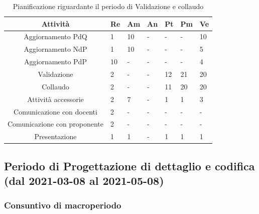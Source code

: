 \begin{table}[H]
	\centering
	\renewcommand{\arraystretch}{1.5}
	\begin{tabular}{|c|p{10mm}|p{10mm}|p{10mm}|p{10mm}|p{10mm}|p{10mm}|}
		\hline
		\rowcolor{lighter-grayer}
		Attività & Re & Am & An & Pt & Pm & Ve \\ \hline
		Aggiornamento PdQ          & 1  & 10 & - & - & - & 10 \\ \hline
		Aggiornamento NdP          & 1  & 10 & - & - & - & 5  \\ \hline
		Aggiornamento PdP          & 10 & - & - & - & - & 4  \\ \hline
		Validazione                & 2  & - & - & 12 & 21 & 20 \\ \hline
		Collaudo                   & 2  & - & - & 11 & 20 & 20 \\ \hline
		Attività accessorie 	   & 2  & 7  & - & 1  & 1  & 3  \\ \hline
		Comunicazione con docenti  & 2  & - & - & - & - & -   \\ \hline
		Comunicazione con proponente& 2  & - & - & - & - & -   \\ \hline
		Presentazione              & 1  & 1  & - & 1  & 1  & 1 \\
		\hline
	\end{tabular}
	 \caption{Pianificazione riguardante il periodo di Validazione e collaudo\\}
\end{table}

\subsection{Periodo di Progettazione di dettaglio e codifica (dal 2021-03-08 al 2021-05-08) }
\subsubsection{Consuntivo di macroperiodo}

